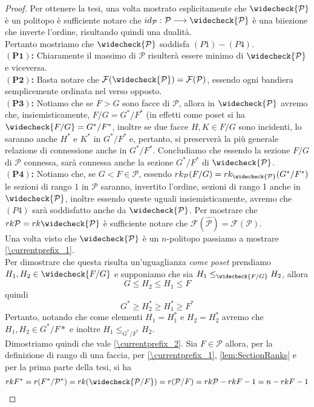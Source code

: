\documentclass[a4paper,12pt]{report}
\newcommand{\p}{\mathcal{P}}
\theoremstyle{plain}
\theoremstyle{definition}
\newcommand\localref[1]{\ref{\currentprefix_#1}}
\begin{document}
\begin{proof}
Per ottenere la tesi, una volta mostrato esplicitamente che $\widecheck{\p}$ \`e un politopo \`e sufficiente notare che
$id_\p:\p\longrightarrow\widecheck{\p}$ \`e una biiezione che inverte l'ordine, risultando quindi una dualit\`a.\\
Pertanto mostriamo che $\widecheck{\p}$ soddisfa $(P1)-(P4)$.\\
$\bm{(P1)}$\textbf{:} Chiaramente il massimo di $\p$ risulter\`a essere minimo di $\widecheck{\p}$ e viceversa.\\
$\bm{(P2)}$\textbf{:} Basta notare che $\mathcal{F}(\widecheck{\p})=\mathcal{F}(\p)$, essendo ogni bandiera semplicemente ordinata
nel verso opposto.\\
$\bm{(P3)}$\textbf{:} Notiamo che se $F>G$ sono facce di $\p$, allora in $\widecheck{\p}$ avremo che, insiemisticamente, $F/G=G^*/{F^*}$ (in effetti
come poset si ha
$\widecheck{F/G}=G^*/{F^*}$, inoltre se due facce $H,K\in F/G$ sono incidenti, lo saranno anche $H^*$ e $K^*$ in $G^*/{F^*}$ e, pertanto, 
si preserver\`a la pi\`u generale relazione di connessione anche in $G^*/{F^*}$. Concludiamo che essendo la sezione $F/G$ di $\p$ connessa,
sar\`a connessa anche la sezione $G^*/{F^*}$ di $\widecheck{\p}$.\\
$\bm{(P4)}$\textbf{:} Notiamo che, se $G<F\in\p$, essendo $rk_\p(F/G)=rk_{\widecheck{\p}}(G^*/{F^*})$ le sezioni di rango $1$ in $\p$ saranno,
invertito l'ordine, sezioni di rango 1 anche in $\widecheck{\p}$, inoltre essendo queste uguali insiemisticamente, avremo che $(P4)$ sar\`a soddisfatto 
anche da $\widecheck{\p}$.
Per mostrare che $rk\p=rk\widecheck{\p}$ \`e sufficiente notare che $\mathcal{F}(\widehat{\p})=\mathcal{F}(\p)$.\\
Una volta visto che $\widecheck{\p}$ \`e un $n$-politopo passiamo a mostrare \localref{1}.\\
Per dimostrare che questa risulta un'uguaglianza \emph{come poset} prendiamo $H_1,H_2\in\widecheck{F/G}$ e supponiamo che sia
$H_1\leq_{\widecheck{F/G}} H_2$, allora
\begin{equation*}
G\leq H_2\leq H_1\leq F
\end{equation*}
quindi
\begin{equation*}
G^*\geq H_2^*\geq H_1^*\geq F^*
\end{equation*}
Pertanto, notando che come elementi $H_1=H_1^*$ e $H_2=H_2^*$ avremo che $H_1,H_2\in G^*/F*$ e inoltre $H_1\leq_{G^*/F^*}H_2$.\\
Dimostriamo quindi che vale \localref{2}. Sia $F\in\p$ allora, per la definizione di rango di una faccia, per \localref{1}, \ref{lem:SectionRanks} e
per la prima parte della tesi, si ha
\begin{gather*}
rkF^*=r(F^*/\p^*)=rk(\widecheck{\p/F})=r(\p/F)=rk\p-rkF-1=n-rkF-1
\end{gather*}

\end{proof}
\end{document}
